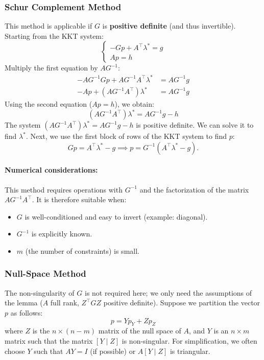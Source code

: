\subsubsection{Schur Complement Method}

This method is applicable if $G$ is \textbf{positive definite} (and thus invertible).
Starting from the KKT system:
\begin{equation}
    \begin{cases}
        -Gp + A^\top \lambda^* = g \\
        Ap = h
    \end{cases}
\end{equation}
Multiply the first equation by $AG^{-1}$:
\begin{align*}
    -AG^{-1}Gp + AG^{-1}A^\top \lambda^* &= AG^{-1}g \\
    -Ap + (AG^{-1}A^\top) \lambda^* &= AG^{-1}g
\end{align*}
Using the second equation ($Ap=h$), we obtain:
\begin{equation}
    (AG^{-1}A^\top) \lambda^* = AG^{-1}g - h
\end{equation}
The system $(AG^{-1}A^\top) \lambda^* = AG^{-1}g - h$ is positive definite. We can solve it to find $\lambda^*$.
Next, we use the first block of rows of the KKT system to find $p$:
\begin{equation}
    Gp = A^\top \lambda^* - g \implies p = G^{-1}(A^\top \lambda^* - g).
\end{equation}

\paragraph{Numerical considerations:}
This method requires operations with $G^{-1}$ and the factorization of the matrix $AG^{-1}A^\top$. It is therefore suitable when:
\begin{itemize}
    \item $G$ is well-conditioned and easy to invert (example: diagonal).
    \item $G^{-1}$ is explicitly known.
    \item $m$ (the number of constraints) is small.
\end{itemize}

\subsubsection{Null-Space Method}

The non-singularity of $G$ is not required here; we only need the assumptions of the lemma ($A$ full rank, $Z^\top G Z$ positive definite).
Suppose we partition the vector $p$ as follows:
\begin{equation}
    p = Y p_Y + Z p_Z
\end{equation}
where $Z$ is the $n \times (n-m)$ matrix of the null space of $A$, and $Y$ is an $n \times m$ matrix such that the matrix $[Y \mid Z]$ is non-singular.
For simplification, we often choose $Y$ such that $AY = I$ (if possible) or $A [Y \mid Z]$ is triangular.

